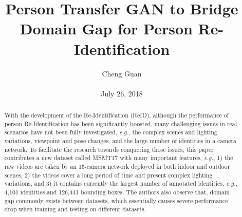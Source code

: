 \documentclass[10pt,twocolumn,letterpaper]{article}
\title{Person Transfer GAN to Bridge Domain Gap for Person Re-Identification}
\author{Cheng Guan\\\\
July 26, 2018}
\begin{document}
\maketitle
\begin{abstract}
	With the development of the Re-Identification (ReID), although the performance of person Re-Identification
	has been significantly boosted, many challenging issues in real scenarios have not been fully investigated, \textit{e.g.},
	the complex scenes and lighting variations, viewpoint and
	pose changes, and the large number of identities in a camera network. To facilitate the research towards conquering those issues, this paper contributes a new dataset called
	MSMT17  with many important features, \textit{e.g.}, 1) the raw
	videos are taken by an 15-camera network deployed in both
	indoor and outdoor scenes, 2) the videos cover a long period of time and present complex lighting variations, and 3)
	it contains currently the largest number of annotated identities, \textit{e.g.}, 4,101 identities and 126,441 bounding boxes. The authors also observe that, domain gap commonly exists between
	datasets, which essentially causes severe performance drop
	when training and testing on different datasets.
\end{abstract}
\end{document}
